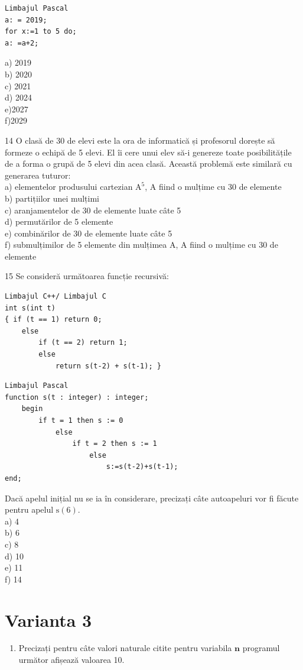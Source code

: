 \documentclass[10pt]{article}
\begin{document}
\begin{verbatim}
Limbajul Pascal
a: = 2019;
for x:=1 to 5 do;
a: =a+2;
\end{verbatim}

a) 2019\\
b) 2020\\
c) 2021\\
d) 2024\\
e)2027\\
f)2029

14 O clasă de 30 de elevi este la ora de informatică și profesorul dorește să formeze o echipă de 5 elevi. El îi cere unui elev să-i genereze toate posibilitățile de a forma o grupă de 5 elevi din acea clasă. Această problemă este similară cu generarea tuturor:\\
a) elementelor produsului cartezian $\mathrm{A}^{5}$, A fiind o mulțime cu 30 de elemente\\
b) partițiilor unei mulțimi\\
c) aranjamentelor de 30 de elemente luate câte 5\\
d) permutărilor de 5 elemente\\
e) combinărilor de 30 de elemente luate câte 5\\
f) submulțimilor de 5 elemente din mulțimea A, A fiind o mulțime cu 30 de elemente

15 Se consideră următoarea funcție recursivă:

\begin{verbatim}
Limbajul C++/ Limbajul C
int s(int t)
{ if (t == 1) return 0;
    else
        if (t == 2) return 1;
        else
            return s(t-2) + s(t-1); }
\end{verbatim}

\begin{verbatim}
Limbajul Pascal
function s(t : integer) : integer;
    begin
        if t = 1 then s := 0
            else
                if t = 2 then s := 1
                    else
                        s:=s(t-2)+s(t-1);
end;
\end{verbatim}

Dacă apelul inițial nu se ia în considerare, precizați câte autoapeluri vor fi făcute pentru apelul $\mathrm{s}(6)$.\\
a) 4\\
b) 6\\
c) 8\\
d) 10\\
e) 11\\
f) 14

\section*{Varianta 3}
\begin{enumerate}
  \item Precizați pentru câte valori naturale citite pentru variabila $\mathbf{n}$ programul următor afișează valoarea 10.
\end{enumerate}
\end{document}
